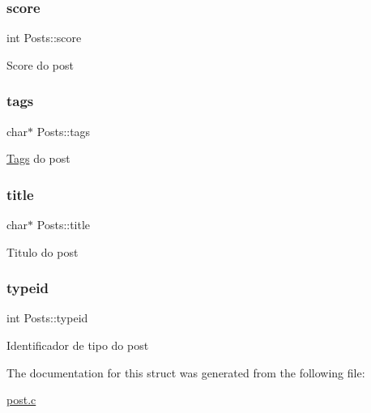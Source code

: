 \subsubsection{\texorpdfstring{score}{score}}
{\footnotesize\ttfamily int Posts\+::score}

Score do post \mbox{\label{structPosts_a53b0e6aa6d0e047171ef3cf32b6b3d5d}} 
\subsubsection{\texorpdfstring{tags}{tags}}
{\footnotesize\ttfamily char$\ast$ Posts\+::tags}

\hyperlink{structTags}{Tags} do post \mbox{\label{structPosts_aa07892a7ecfb96794d258ea8aeba0c22}} 
\subsubsection{\texorpdfstring{title}{title}}
{\footnotesize\ttfamily char$\ast$ Posts\+::title}

Titulo do post \mbox{\label{structPosts_ae539b56e598f13b797e3789122bbc86e}} 
\subsubsection{\texorpdfstring{typeid}{typeid}}
{\footnotesize\ttfamily int Posts\+::typeid}

Identificador de tipo do post 

The documentation for this struct was generated from the following file\+:\begin{DoxyCompactItemize}
\item 
\hyperlink{post_8c}{post.\+c}\end{DoxyCompactItemize}
